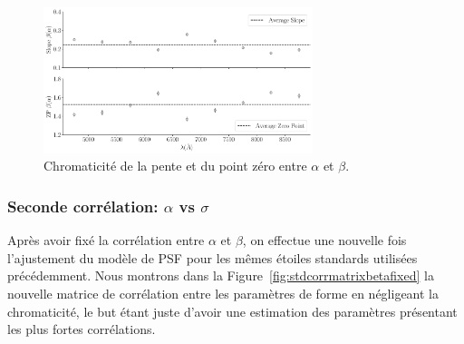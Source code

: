 \documentclass[../main/main.tex]{subfiles}
\begin{document}
\begin{figure}[ht]
  \centering
  \includegraphics[width=0.7\textwidth]{../figures/06_irf/chromaticitybeta_alpha_corr.pdf}
  \caption[Chromaticité de la pente et du point zéro entre $\alpha$ et $\beta$]{Chromaticité de la pente et du point zéro entre $\alpha$ et $\beta$.}
  \label{fig:chromslope_zp_alphabeta}
\end{figure}


\subsubsection{Seconde corrélation: $\alpha$ vs $\sigma$}


Après avoir fixé la corrélation entre $\alpha$ et $\beta$, on effectue
une nouvelle fois l'ajustement du modèle de PSF pour les mêmes étoiles
standards utilisées précédemment. Nous montrons dans la
Figure~\ref{fig:stdcorrmatrixbetafixed} la nouvelle matrice de
corrélation entre les paramètres de forme en négligeant la chromaticité,
le but étant juste d'avoir une estimation des paramètres présentant les
plus fortes corrélations.
\end{document}
